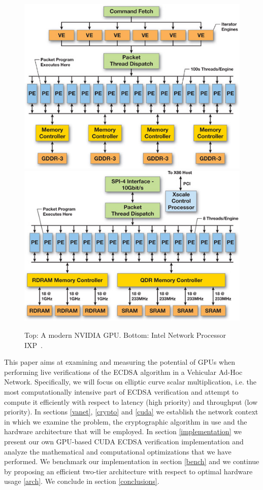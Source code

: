 \documentclass[11pt,twocolumn]{IEEEtran}
\begin{document}
\begin{figure}[h!]
\centering
\includegraphics[scale=0.65]{gpu}
\includegraphics[scale=0.65]{net}
\caption{Top: A modern NVIDIA GPU.
Bottom: Intel Network Processor IXP~\cite{gpugems}.}
\end{figure}
This paper aims at examining and measuring the potential of GPUs when performing live verifications of the ECDSA algorithm in a Vehicular Ad-Hoc Network. Specifically, we will focus on elliptic curve scalar multiplication, i.e. the most computationally intensive part of ECDSA verification and attempt to compute it efficiently with respect to latency (high priority) and throughput (low priority). In sections \ref{vanet}, \ref{crypto} and \ref{cuda} we establish the network context in which we examine the problem, the cryptographic algorithm in use and the hardware architecture that will be employed. In section \ref{implementation} we present our own GPU-based CUDA ECDSA verification implementation and analyze the mathematical and computational optimizations that we have performed. We benchmark our implementation in section \ref{bench} and we continue by proposing an efficient two-tier architecture with respect to optimal hardware usage \ref{arch}. We conclude in section \ref{conclusions}. 
\end{document}
